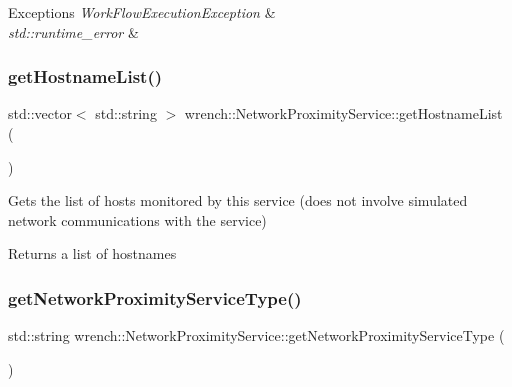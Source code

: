 \begin{DoxyExceptions}{Exceptions}
{\em Work\+Flow\+Execution\+Exception} & \\
\hline
{\em std\+::runtime\+\_\+error} & \\
\hline
\end{DoxyExceptions}
\mbox{\label{classwrench_1_1_network_proximity_service_a5e3f4189424c2d44db198efb7984e3ef}} 
\subsubsection{\texorpdfstring{get\+Hostname\+List()}{getHostnameList()}}
{\footnotesize\ttfamily std\+::vector$<$ std\+::string $>$ wrench\+::\+Network\+Proximity\+Service\+::get\+Hostname\+List (\begin{DoxyParamCaption}{ }\end{DoxyParamCaption})}



Gets the list of hosts monitored by this service (does not involve simulated network communications with the service) 

\begin{DoxyReturn}{Returns}
a list of hostnames 
\end{DoxyReturn}
\mbox{\label{classwrench_1_1_network_proximity_service_a3a70bf6b279c431f5f9cffc4207822af}} 
\subsubsection{\texorpdfstring{get\+Network\+Proximity\+Service\+Type()}{getNetworkProximityServiceType()}}
{\footnotesize\ttfamily std\+::string wrench\+::\+Network\+Proximity\+Service\+::get\+Network\+Proximity\+Service\+Type (\begin{DoxyParamCaption}{ }\end{DoxyParamCaption})}



